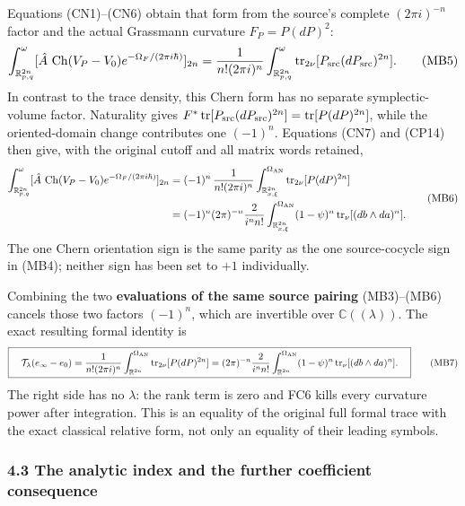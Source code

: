 \documentclass[
  11pt,
]{article}
\begin{document}
Equations (CN1)--(CN6) obtain that form from the source's complete
\((2\pi i)^{-n}\) factor and the actual Grassmann curvature
\(F_P=P(dP)^2\): \[
 \int_{\mathbb R^{2n}_{p,q}}^\omega
   [\hat A\,\operatorname{Ch}(V_P-V_0)
      e^{-\Omega_F/(2\pi i\hbar)}]_{2n}
 =\frac{1}{n!(2\pi i)^n}
      \int_{\mathbb R^{2n}_{p,q}}^\omega
          \operatorname{tr}_{2\nu}
             [P_{\rm src}(dP_{\rm src})^{2n}] .
 \tag{MB5}
\] In contrast to the trace density, this Chern form has no separate
symplectic-volume factor. Naturality gives
\(F^*\operatorname{tr}[P_{\rm src}(dP_{\rm src})^{2n}]
=\operatorname{tr}[P(dP)^{2n}]\), while the oriented-domain change
contributes one \((-1)^n\). Equations (CN7) and (CP14) then give, with
the original cutoff and all matrix words retained, \[
 \begin{aligned}
 \int_{\mathbb R^{2n}_{p,q}}^\omega
   [\hat A\,\operatorname{Ch}(V_P-V_0)
      e^{-\Omega_F/(2\pi i\hbar)}]_{2n}
 &=(-1)^n\,\frac{1}{n!(2\pi i)^n}
      \int_{\mathbb R^{2n}_{x,\xi}}^{\Omega_{\rm AN}}
       \operatorname{tr}_{2\nu}[P(dP)^{2n}]\\
 &=(-1)^n(2\pi)^{-n}\frac{2}{i^n n!}
      \int_{\mathbb R^{2n}_{x,\xi}}^{\Omega_{\rm AN}}
       (1-\psi)^n\operatorname{tr}_{\nu}[(db\wedge da)^n].
 \end{aligned}
 \tag{MB6}
\] The one Chern orientation sign is the same parity as the one
source-cocycle sign in (MB4); neither sign has been set to \(+1\)
individually.

Combining the two \textbf{evaluations of the same source pairing}
(MB3)--(MB6) cancels those two factors \((-1)^n\), which are invertible
over \(\mathbb C((\lambda))\). The exact resulting formal identity is \[
 \boxed{\quad
 \mathcal T_\lambda(e_\infty-e_0)
 =\frac{1}{n!(2\pi i)^n}
      \int_{\mathbb R^{2n}}^{\Omega_{\rm AN}}
       \operatorname{tr}_{2\nu}[P(dP)^{2n}]
 =(2\pi)^{-n}\frac{2}{i^n n!}
      \int_{\mathbb R^{2n}}^{\Omega_{\rm AN}}
       (1-\psi)^n\operatorname{tr}_{\nu}[(db\wedge da)^n].
 \quad}
 \tag{MB7}
\] The right side has no \(\lambda\): the rank term is zero and FC6
kills every curvature power after integration. This is an equality of
the original full formal trace with the exact classical relative form,
not only an equality of their leading symbols.

\subsubsection{4.3 The analytic index and the further coefficient
consequence}\label{the-analytic-index-and-the-further-coefficient-consequence}
\end{document}
